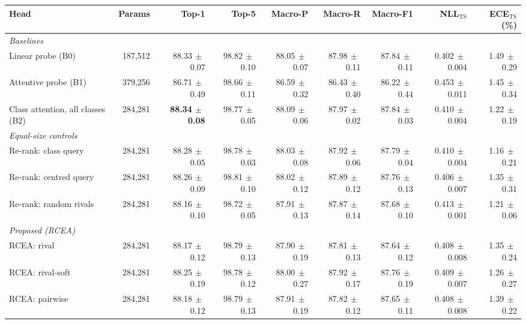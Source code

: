 \begin{tabular}{lrrrrrrrr}
\toprule
Head & Params & Top-1 & Top-5 & Macro-P & Macro-R & Macro-F1 & NLL$_{\mathrm{TS}}$ & ECE$_{\mathrm{TS}}$ (\%) \\
\midrule
\multicolumn{9}{l}{\emph{Baselines}} \\
Linear probe (B0) & 187,512 & 88.33{\scriptsize$\,\pm\,$0.07} & 98.82{\scriptsize$\,\pm\,$0.10} & 88.05{\scriptsize$\,\pm\,$0.07} & 87.98{\scriptsize$\,\pm\,$0.11} & 87.84{\scriptsize$\,\pm\,$0.11} & 0.402{\scriptsize$\,\pm\,$0.004} & 1.49{\scriptsize$\,\pm\,$0.29} \\
Attentive probe (B1) & 379,256 & 86.71{\scriptsize$\,\pm\,$0.49} & 98.66{\scriptsize$\,\pm\,$0.11} & 86.59{\scriptsize$\,\pm\,$0.32} & 86.43{\scriptsize$\,\pm\,$0.40} & 86.22{\scriptsize$\,\pm\,$0.44} & 0.453{\scriptsize$\,\pm\,$0.011} & 1.45{\scriptsize$\,\pm\,$0.34} \\
Class attention, all classes (B2) & 284,281 & \textbf{88.34{\scriptsize$\,\pm\,$0.08}} & 98.77{\scriptsize$\,\pm\,$0.05} & 88.09{\scriptsize$\,\pm\,$0.06} & 87.97{\scriptsize$\,\pm\,$0.02} & 87.84{\scriptsize$\,\pm\,$0.03} & 0.410{\scriptsize$\,\pm\,$0.004} & 1.22{\scriptsize$\,\pm\,$0.19} \\
\multicolumn{9}{l}{\emph{Equal-size controls}} \\
Re-rank: class query & 284,281 & 88.28{\scriptsize$\,\pm\,$0.05} & 98.78{\scriptsize$\,\pm\,$0.03} & 88.03{\scriptsize$\,\pm\,$0.08} & 87.92{\scriptsize$\,\pm\,$0.06} & 87.79{\scriptsize$\,\pm\,$0.04} & 0.410{\scriptsize$\,\pm\,$0.004} & 1.16{\scriptsize$\,\pm\,$0.21} \\
Re-rank: centred query & 284,281 & 88.26{\scriptsize$\,\pm\,$0.09} & 98.81{\scriptsize$\,\pm\,$0.10} & 88.02{\scriptsize$\,\pm\,$0.12} & 87.89{\scriptsize$\,\pm\,$0.12} & 87.76{\scriptsize$\,\pm\,$0.13} & 0.406{\scriptsize$\,\pm\,$0.007} & 1.35{\scriptsize$\,\pm\,$0.31} \\
Re-rank: random rivals & 284,281 & 88.16{\scriptsize$\,\pm\,$0.10} & 98.72{\scriptsize$\,\pm\,$0.05} & 87.91{\scriptsize$\,\pm\,$0.13} & 87.87{\scriptsize$\,\pm\,$0.14} & 87.68{\scriptsize$\,\pm\,$0.10} & 0.413{\scriptsize$\,\pm\,$0.001} & 1.21{\scriptsize$\,\pm\,$0.06} \\
\multicolumn{9}{l}{\emph{Proposed (RCEA)}} \\
RCEA: rival & 284,281 & 88.17{\scriptsize$\,\pm\,$0.12} & 98.79{\scriptsize$\,\pm\,$0.13} & 87.90{\scriptsize$\,\pm\,$0.19} & 87.81{\scriptsize$\,\pm\,$0.13} & 87.64{\scriptsize$\,\pm\,$0.12} & 0.408{\scriptsize$\,\pm\,$0.008} & 1.35{\scriptsize$\,\pm\,$0.24} \\
RCEA: rival-soft & 284,281 & 88.25{\scriptsize$\,\pm\,$0.19} & 98.78{\scriptsize$\,\pm\,$0.12} & 88.00{\scriptsize$\,\pm\,$0.27} & 87.92{\scriptsize$\,\pm\,$0.17} & 87.76{\scriptsize$\,\pm\,$0.19} & 0.409{\scriptsize$\,\pm\,$0.007} & 1.26{\scriptsize$\,\pm\,$0.27} \\
RCEA: pairwise & 284,281 & 88.18{\scriptsize$\,\pm\,$0.12} & 98.79{\scriptsize$\,\pm\,$0.13} & 87.91{\scriptsize$\,\pm\,$0.19} & 87.82{\scriptsize$\,\pm\,$0.12} & 87.65{\scriptsize$\,\pm\,$0.11} & 0.408{\scriptsize$\,\pm\,$0.008} & 1.39{\scriptsize$\,\pm\,$0.22} \\
\bottomrule
\end{tabular}
